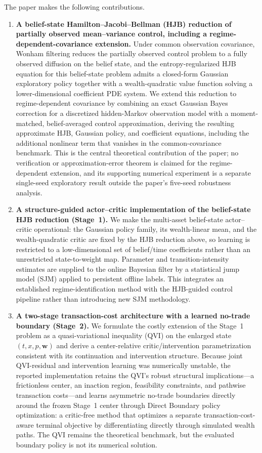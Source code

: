 \documentclass[a4paper,10pt]{article}
\newcommand{\bw}{\bm{w}}
\begin{document}
The paper makes the following contributions.
\begin{enumerate}[label=(\roman*)]
\item \textbf{A belief-state Hamilton--Jacobi--Bellman (HJB) reduction of partially observed mean--variance control, including a regime-dependent-covariance extension.} Under common observation covariance, Wonham filtering reduces the partially observed control problem to a fully observed diffusion on the belief state, and the entropy-regularized HJB equation for this belief-state problem admits a closed-form Gaussian exploratory policy together with a wealth-quadratic value function solving a lower-dimensional coefficient PDE system. We extend this reduction to regime-dependent covariance by combining an exact Gaussian Bayes correction for a discretized hidden-Markov observation model with a moment-matched, belief-averaged control approximation, deriving the resulting approximate HJB, Gaussian policy, and coefficient equations, including the additional nonlinear term that vanishes in the common-covariance benchmark. This is the central theoretical contribution of the paper; no verification or approximation-error theorem is claimed for the regime-dependent extension, and its supporting numerical experiment is a separate single-seed exploratory result outside the paper's five-seed robustness analysis.

\item \textbf{A structure-guided actor--critic implementation of the belief-state HJB reduction (Stage~1).} We make the multi-asset belief-state actor--critic operational: the Gaussian policy family, its wealth-linear mean, and the wealth-quadratic critic are fixed by the HJB reduction above, so learning is restricted to a low-dimensional set of belief/time coefficients rather than an unrestricted state-to-weight map. Parameter and transition-intensity estimates are supplied to the online
Bayesian filter by a statistical jump model (SJM) applied to persistent
offline labels. This integrates an established regime-identification method
with the HJB-guided control pipeline rather than introducing new SJM
methodology.

\item \textbf{A two-stage transaction-cost architecture with a learned no-trade boundary (Stage~2).} We formulate the costly extension of the Stage~1 problem as a quasi-variational inequality (QVI) on the enlarged state $(t,x,p,\bw)$ and derive a center-relative critic/intervention parametrization consistent with its continuation and intervention structure. Because joint QVI-residual and intervention learning was numerically unstable, the reported implementation retains the QVI's robust structural implications---a frictionless center, an inaction region, feasibility constraints, and pathwise transaction costs---and learns asymmetric no-trade boundaries directly around the frozen Stage~1 center through Direct Boundary policy optimization: a critic-free method that optimizes a separate transaction-cost-aware terminal objective by differentiating directly through simulated wealth paths. The QVI remains the theoretical benchmark, but the evaluated boundary policy is not its numerical solution.


\end{enumerate}
\end{document}

